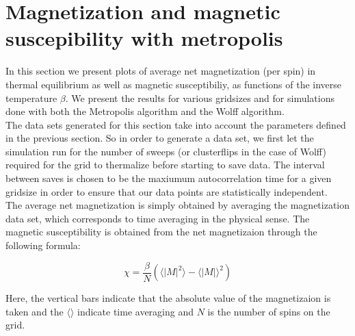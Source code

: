\documentclass[11pt,a4paper]{article}
\begin{document}
\pagebreak





\section{Magnetization and magnetic suscepibility with metropolis}

In this section we present plots of average net magnetization (per spin) in thermal equilibrium as well as magnetic
 susceptibiliy, as functions of the inverse temperature $\beta$. We present the results for various gridsizes and for
 simulations done with both the Metropolis algorithm and the Wolff algorithm. \\

The data sets generated for this section take into account the parameters defined in the previous section. So in order to
 generate a data set, we first let the simulation run for the number of sweeps (or clusterflips in the case of Wolff) required
 for the grid to thermalize before starting to save data. The interval between saves is chosen to be the maxiumum autocorrelation
 time for a given gridsize in order to ensure that our data points are statistically independent. \\

The average net magnetization is simply obtained by averaging the magnetization data set, which corresponds to time averaging in 
 the physical sense. The magnetic susceptibility is obtained from the net magnetizaion through the following formula:


\begin{equation*}
  \chi = \frac{\beta}{N} (\langle |M|^2 \rangle - \langle |M| \rangle^2)
\end{equation*}

Here, the vertical bars indicate that the absolute value of the magnetizaion is taken and the $\langle \rangle$ indicate time
 averaging and $N$ is the number of spins on the grid. 



\end{document}
